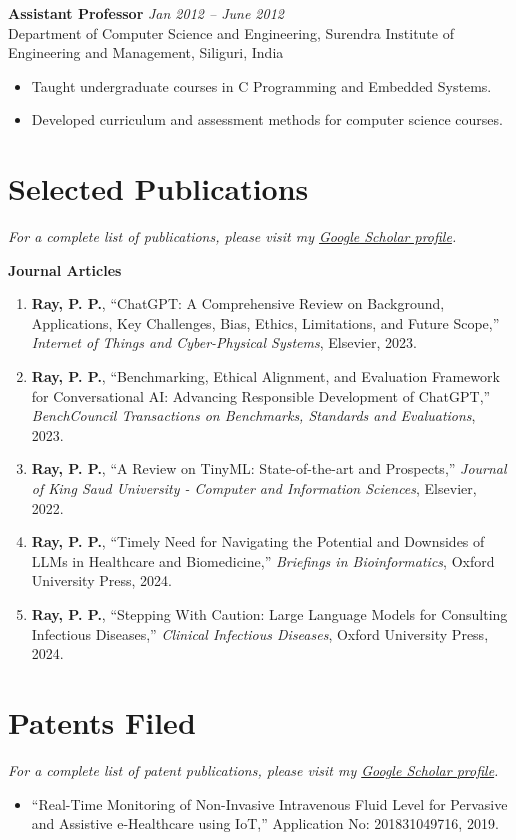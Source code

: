 \documentclass[10pt,a4paper]{article}
\begin{document}
	\textbf{Assistant Professor} \hfill \textit{Jan 2012 -- June 2012}\\
	Department of Computer Science and Engineering, Surendra Institute of Engineering and Management, Siliguri, India
	\begin{itemize}[leftmargin=0.2in]
		\item Taught undergraduate courses in C Programming and Embedded Systems.
		\item Developed curriculum and assessment methods for computer science courses.
	\end{itemize}
	
	\section*{Selected Publications}
	
	\textit{For a complete list of publications, please visit my \href{https://scholar.google.co.in/citations?user=ioplfagAAAAJ&hl=en&oi=ao}{Google Scholar profile}.}
	
	\textbf{Journal Articles}
	\begin{enumerate}[leftmargin=0.2in]
		\item \textbf{Ray, P. P.}, “ChatGPT: A Comprehensive Review on Background, Applications, Key Challenges, Bias, Ethics, Limitations, and Future Scope,” \textit{Internet of Things and Cyber-Physical Systems}, Elsevier, 2023.
		\item \textbf{Ray, P. P.}, “Benchmarking, Ethical Alignment, and Evaluation Framework for Conversational AI: Advancing Responsible Development of ChatGPT,” \textit{BenchCouncil Transactions on Benchmarks, Standards and Evaluations}, 2023.
		\item \textbf{Ray, P. P.}, “A Review on TinyML: State-of-the-art and Prospects,” \textit{Journal of King Saud University - Computer and Information Sciences}, Elsevier, 2022.
		\item \textbf{Ray, P. P.}, “Timely Need for Navigating the Potential and Downsides of LLMs in Healthcare and Biomedicine,” \textit{Briefings in Bioinformatics}, Oxford University Press, 2024.
		\item \textbf{Ray, P. P.}, “Stepping With Caution: Large Language Models for Consulting Infectious Diseases,” \textit{Clinical Infectious Diseases}, Oxford University Press, 2024.
	\end{enumerate}
	
	\section*{Patents Filed}
   \textit{For a complete list of patent publications, please visit my \href{https://scholar.google.co.in/citations?user=ioplfagAAAAJ&hl=en&oi=ao}{Google Scholar profile}.}
	\begin{itemize}[leftmargin=0.15in]

		\item “Real-Time Monitoring of Non-Invasive Intravenous Fluid Level for Pervasive and Assistive e-Healthcare using IoT,” Application No: 201831049716, 2019.
	\end{itemize}
	
\end{document}
